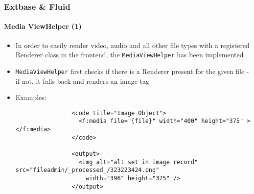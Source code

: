 
\begin{frame}[fragile]
	\frametitle{Extbase \& Fluid}
	\framesubtitle{Media ViewHelper (1)}

	\lstset{basicstyle=\tiny\ttfamily}

	\begin{itemize}

		\item In order to easily render video, audio and all other file types with
			a registered Renderer class in the frontend, the \texttt{MediaViewHelper}
			has been implemented

		\item \texttt{MediaViewHelper} first checks if there is a Renderer present for
			the given file - if not, it falls back and renders an image tag

		\item Examples:

			\begin{lstlisting}
				<code title="Image Object">
				  <f:media file="{file}" width="400" height="375" ></f:media>
				</code>

				<output>
				  <img alt="alt set in image record" src="fileadmin/_processed_/323223424.png"
				    width="396" height="375" />
				</output>
			\end{lstlisting}

	\end{itemize}

\end{frame}


